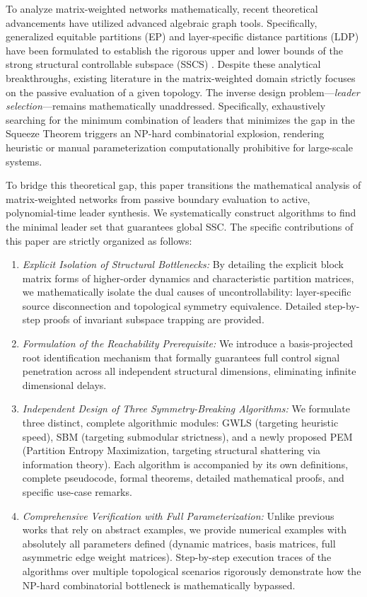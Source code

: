 \documentclass{IEEEtran}
\begin{document}
	To analyze matrix-weighted networks mathematically, recent theoretical advancements have utilized advanced algebraic graph tools. Specifically, generalized equitable partitions (EP) and layer-specific distance partitions (LDP) have been formulated to establish the rigorous upper and lower bounds of the strong structural controllable subspace (SSCS) \cite{c9,c10,c13}. Despite these analytical breakthroughs, existing literature in the matrix-weighted domain strictly focuses on the passive evaluation of a given topology. The inverse design problem—\textit{leader selection}—remains mathematically unaddressed. Specifically, exhaustively searching for the minimum combination of leaders that minimizes the gap in the Squeeze Theorem triggers an NP-hard combinatorial explosion, rendering heuristic or manual parameterization computationally prohibitive for large-scale systems.
	
	To bridge this theoretical gap, this paper transitions the mathematical analysis of matrix-weighted networks from passive boundary evaluation to active, polynomial-time leader synthesis. We systematically construct algorithms to find the minimal leader set that guarantees global SSC. The specific contributions of this paper are strictly organized as follows:
	
	\begin{enumerate}
		\item \textit{Explicit Isolation of Structural Bottlenecks:} By detailing the explicit block matrix forms of higher-order dynamics and characteristic partition matrices, we mathematically isolate the dual causes of uncontrollability: layer-specific source disconnection and topological symmetry equivalence. Detailed step-by-step proofs of invariant subspace trapping are provided.
		\item \textit{Formulation of the Reachability Prerequisite:} We introduce a basis-projected root identification mechanism that formally guarantees full control signal penetration across all independent structural dimensions, eliminating infinite dimensional delays.
		\item \textit{Independent Design of Three Symmetry-Breaking Algorithms:} We formulate three distinct, complete algorithmic modules: GWLS (targeting heuristic speed), SBM (targeting submodular strictness), and a newly proposed PEM (Partition Entropy Maximization, targeting structural shattering via information theory). Each algorithm is accompanied by its own definitions, complete pseudocode, formal theorems, detailed mathematical proofs, and specific use-case remarks.
		\item \textit{Comprehensive Verification with Full Parameterization:} Unlike previous works that rely on abstract examples, we provide numerical examples with absolutely all parameters defined (dynamic matrices, basis matrices, full asymmetric edge weight matrices). Step-by-step execution traces of the algorithms over multiple topological scenarios rigorously demonstrate how the NP-hard combinatorial bottleneck is mathematically bypassed.
	\end{enumerate}
	
\end{document}
